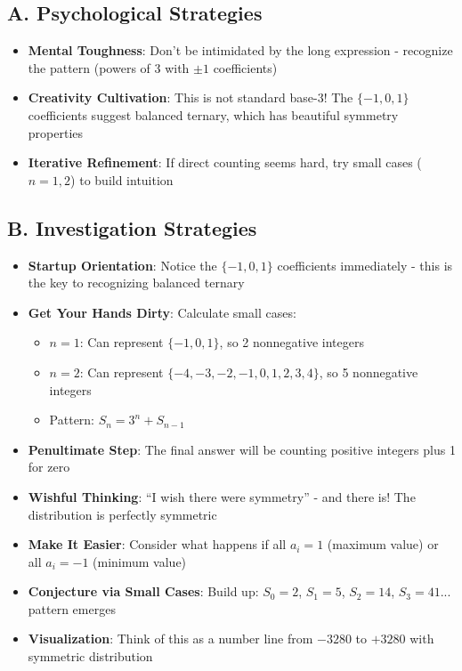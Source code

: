 \documentclass[12pt]{article}
\begin{document}
\begin{strategicbox}
\subsection*{A. Psychological Strategies}
\begin{itemize}[leftmargin=*]
    \item \textbf{Mental Toughness}: Don't be intimidated by the long expression - recognize the pattern (powers of 3 with $\pm1$ coefficients)
    \item \textbf{Creativity Cultivation}: This is not standard base-3! The $\{-1,0,1\}$ coefficients suggest balanced ternary, which has beautiful symmetry properties
    \item \textbf{Iterative Refinement}: If direct counting seems hard, try small cases ($n=1,2$) to build intuition
\end{itemize}

\subsection*{B. Investigation Strategies}
\begin{itemize}[leftmargin=*]
    \item \textbf{Startup Orientation}: Notice the $\{-1,0,1\}$ coefficients immediately - this is the key to recognizing balanced ternary
    \item \textbf{Get Your Hands Dirty}: Calculate small cases:
    \begin{itemize}
        \item $n=1$: Can represent $\{-1,0,1\}$, so 2 nonnegative integers
        \item $n=2$: Can represent $\{-4,-3,-2,-1,0,1,2,3,4\}$, so 5 nonnegative integers
        \item Pattern: $S_n = 3^n + S_{n-1}$
    \end{itemize}
    \item \textbf{Penultimate Step}: The final answer will be counting positive integers plus 1 for zero
    \item \textbf{Wishful Thinking}: ``I wish there were symmetry'' - and there is! The distribution is perfectly symmetric
    \item \textbf{Make It Easier}: Consider what happens if all $a_i = 1$ (maximum value) or all $a_i = -1$ (minimum value)
    \item \textbf{Conjecture via Small Cases}: Build up: $S_0=2$, $S_1=5$, $S_2=14$, $S_3=41$... pattern emerges
    \item \textbf{Visualization}: Think of this as a number line from $-3280$ to $+3280$ with symmetric distribution
\end{itemize}


\end{strategicbox}
\end{document}
